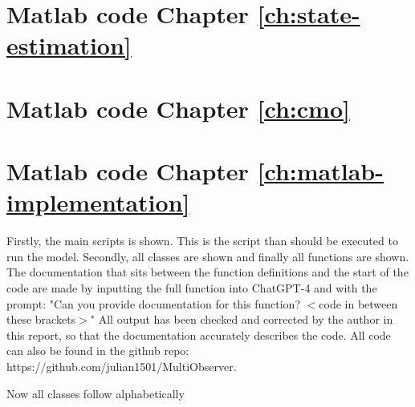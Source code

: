 \begin{appendices}
\newpage
\section{Matlab code Chapter \ref{ch:state-estimation}}\label{ap:matlab-code-ch3}


\newpage
\section{Matlab code Chapter \ref{ch:cmo}}\label{ap:matlab-code-ch6}


\newpage
\section{Matlab code Chapter \ref{ch:matlab-implementation}}\label{ap:matlab-code}
Firstly, the main scripts is shown. This is the script than should be executed to run the model. Secondly, all classes are shown and finally all functions are shown. The documentation that sits between the function definitions and the start of the code are made by inputting the full function into ChatGPT-4 and with the prompt: "Can you provide documentation for this function? $<$code in between these brackets$>$" All output has been checked and corrected by the author in this report, so that the documentation accurately describes the code. All code can also be found in the github repo: https://github.com/julian1501/MultiObserver.

Now all classes follow alphabetically








\end{appendices}
